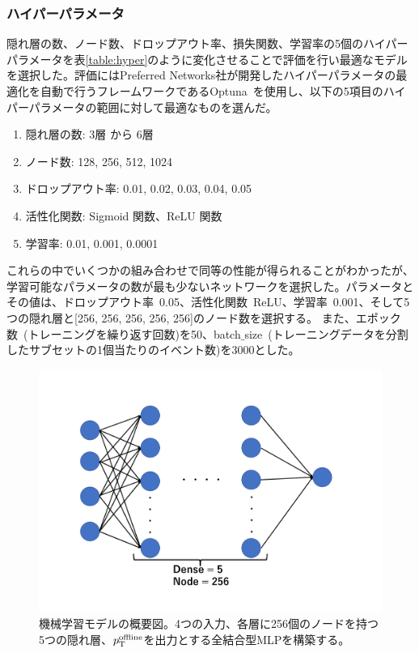 \subsubsection{ハイパーパラメータ}
隠れ層の数、ノード数、ドロップアウト率、損失関数、学習率の5個のハイパーパラメータを表\ref{table:hyper}のように変化させることで評価を行い最適なモデルを選択した。評価にはPreferred Networks社が開発したハイパーパラメータの最適化を自動で行うフレームワークであるOptuna~\cite{article:optuna}を使用し、以下の5項目のハイパーパラメータの範囲に対して最適なものを選んだ。
\begin{enumerate}\label{table:hyper}
   \item 隠れ層の数: 3層 から 6層
   \item ノード数: 128, 256, 512, 1024
   \item ドロップアウト率: 0.01, 0.02, 0.03, 0.04, 0.05
   \item 活性化関数: Sigmoid 関数、ReLU 関数
   \item 学習率: 0.01, 0.001, 0.0001
\end{enumerate}
これらの中でいくつかの組み合わせで同等の性能が得られることがわかったが、学習可能なパラメータの数が最も少ないネットワークを選択した。パラメータとその値は、ドロップアウト率~0.05、活性化関数~ReLU、学習率~0.001、そして5つの隠れ層と[256, 256, 256, 256, 256]のノード数を選択する。
また、エポック数~(トレーニングを繰り返す回数)を50、batch$\_$size~(トレーニングデータを分割したサブセットの1個当たりのイベント数)を3000とした。

\begin{figure}[tb]
  \centering
  \includegraphics[clip, width=12cm]{fig/4/MLP_3.pdf}
  \caption{機械学習モデルの概要図。4つの入力、各層に256個のノードを持つ5つの隠れ層、$p_{\rm{T}}^{\rm{offline}}$を出力とする全結合型MLPを構築する。}
  \label{fig:MLP_overview}
\end{figure}


